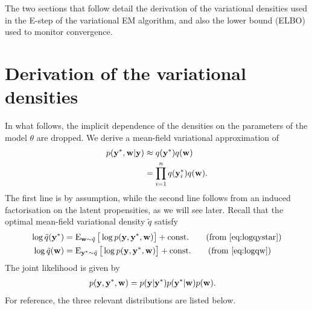 The two sections that follow detail the derivation of the variational densities used in the E-step of the variational EM algorithm, and also the lower bound (ELBO) used to monitor convergence.

\section{Derivation of the variational densities}

In what follows, the implicit dependence of the densities on the parameters of the model $\theta$ are dropped.
We derive a mean-field variational approximation of
\begin{align*}
  p({\mathbf y}^*, {\mathbf w}| {\mathbf y}) 
  &\approx q({\mathbf y}^*)q({\mathbf w}) \\
  &= \prod_{i=1}^n q({\mathbf y}_{i}^*)q({\mathbf w}).
\end{align*}
The first line is by assumption, while the second line follows from an induced factorisation on the latent propensities, as we will see later. 
Recall that the optimal mean-field variational density $\tilde q$ satisfy
\begin{align}
  \log \tilde q(\by^*) &= \E_{\bw\sim\tilde q} \big[ \log p(\by,\by^*,\bw) \big] + \const \tag{from \ref{eq:logqystar}} \\
  \log \tilde q(\bw) &= \E_{\by^*\sim\tilde q} \big[ \log p(\by,\by^*,\bw) \big] + \const \tag{from \ref{eq:logqw}}
\end{align}
The joint likelihood is given by
\begin{align*}
  p({\mathbf y}, {\mathbf y}^*,{\mathbf w}) 
  &= p({\mathbf y}|{\mathbf y}^*) p({\mathbf y}^* | {\mathbf w}) p({\mathbf w}).
\end{align*}
For reference, the three relevant distributions are listed below.

